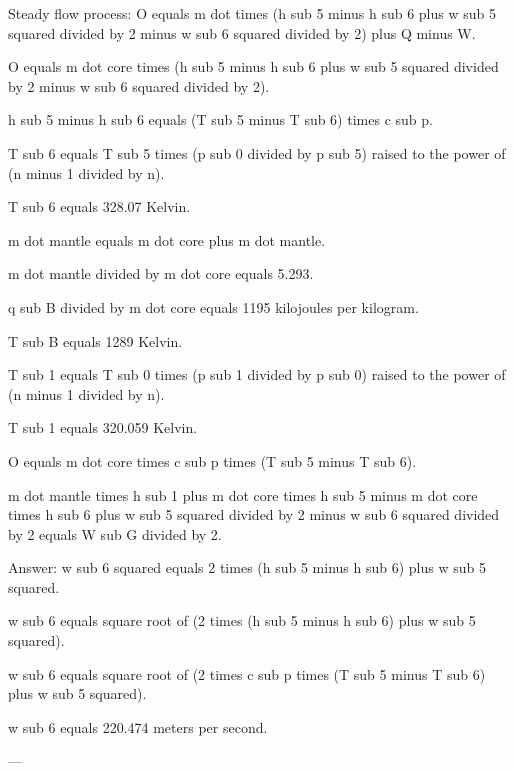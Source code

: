 Steady flow process:  
O equals m dot times (h sub 5 minus h sub 6 plus w sub 5 squared divided by 2 minus w sub 6 squared divided by 2) plus Q minus W.  

O equals m dot core times (h sub 5 minus h sub 6 plus w sub 5 squared divided by 2 minus w sub 6 squared divided by 2).  

h sub 5 minus h sub 6 equals (T sub 5 minus T sub 6) times c sub p.  

T sub 6 equals T sub 5 times (p sub 0 divided by p sub 5) raised to the power of (n minus 1 divided by n).  

T sub 6 equals 328.07 Kelvin.  

m dot mantle equals m dot core plus m dot mantle.  

m dot mantle divided by m dot core equals 5.293.  

q sub B divided by m dot core equals 1195 kilojoules per kilogram.  

T sub B equals 1289 Kelvin.  

T sub 1 equals T sub 0 times (p sub 1 divided by p sub 0) raised to the power of (n minus 1 divided by n).  

T sub 1 equals 320.059 Kelvin.  

O equals m dot core times c sub p times (T sub 5 minus T sub 6).  

m dot mantle times h sub 1 plus m dot core times h sub 5 minus m dot core times h sub 6 plus w sub 5 squared divided by 2 minus w sub 6 squared divided by 2 equals W sub G divided by 2.  

Answer:  
w sub 6 squared equals 2 times (h sub 5 minus h sub 6) plus w sub 5 squared.  

w sub 6 equals square root of (2 times (h sub 5 minus h sub 6) plus w sub 5 squared).  

w sub 6 equals square root of (2 times c sub p times (T sub 5 minus T sub 6) plus w sub 5 squared).  

w sub 6 equals 220.474 meters per second.  

---